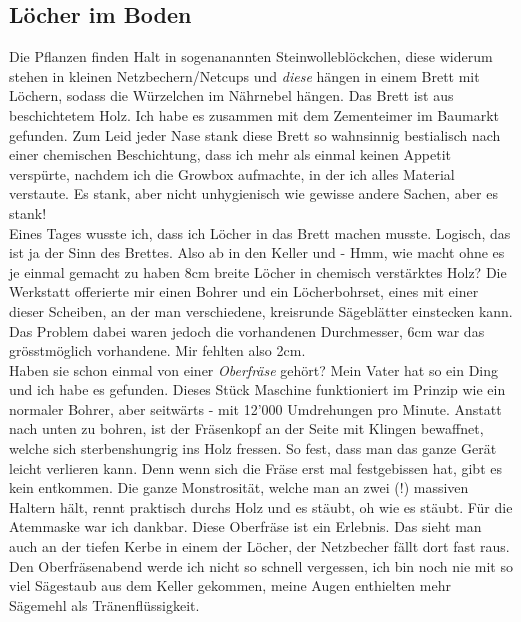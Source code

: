 \documentclass[12pt,titlepage,a4paper]{article}
\begin{document}
\subsection{Löcher im Boden}
Die Pflanzen finden Halt in sogenanannten Steinwolleblöckchen, diese widerum stehen in kleinen Netzbechern/Netcups und \textit{diese} hängen in einem Brett mit Löchern, sodass die Würzelchen im Nährnebel hängen. Das Brett ist aus beschichtetem Holz. Ich habe es zusammen mit dem Zementeimer im Baumarkt gefunden. Zum Leid jeder Nase stank diese Brett so wahnsinnig bestialisch nach einer chemischen Beschichtung, dass ich mehr als einmal keinen Appetit verspürte, nachdem ich die Growbox aufmachte, in der ich alles Material verstaute. Es stank, aber nicht unhygienisch wie gewisse andere Sachen, aber es stank! \\Eines Tages wusste ich, dass ich Löcher in das Brett machen musste. Logisch, das ist ja der Sinn des Brettes. Also ab in den Keller und - Hmm, wie macht ohne es je einmal gemacht zu haben 8cm breite Löcher in chemisch verstärktes Holz? Die Werkstatt offerierte mir einen Bohrer und ein Löcherbohrset, eines mit einer dieser Scheiben, an der man verschiedene, kreisrunde Sägeblätter einstecken kann. Das Problem dabei waren jedoch die vorhandenen Durchmesser, 6cm war das grösstmöglich vorhandene. Mir fehlten also 2cm. \\
Haben sie schon einmal von einer \textit{Oberfräse} gehört? Mein Vater hat so ein Ding und ich habe es gefunden. Dieses Stück Maschine funktioniert im Prinzip wie ein normaler Bohrer, aber seitwärts - mit 12'000 Umdrehungen pro Minute. Anstatt nach unten zu bohren, ist der Fräsenkopf an der Seite mit Klingen bewaffnet, welche sich sterbenshungrig ins Holz fressen. So fest, dass man das ganze Gerät leicht verlieren kann. Denn wenn sich die Fräse erst mal festgebissen hat, gibt es kein entkommen. Die ganze Monstrosität, welche man an zwei (!) massiven Haltern hält, rennt praktisch durchs Holz und es stäubt, oh wie es stäubt. Für die Atemmaske war ich dankbar. Diese Oberfräse ist ein Erlebnis. Das sieht man auch an der tiefen Kerbe in einem der Löcher, der Netzbecher fällt dort fast raus. Den Oberfräsenabend werde ich nicht so schnell vergessen, ich bin noch nie mit so viel Sägestaub aus dem Keller gekommen, meine Augen enthielten mehr Sägemehl als Tränenflüssigkeit.
\newpage
\end{document}
